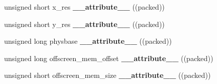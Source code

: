 \begin{DoxyCompactItemize}
\mbox{\label{structvbe__mode__info_a1abb0823b09518fd0309f96668c5eb8f}} 
unsigned short x\+\_\+res {\bfseries \+\_\+\+\_\+attribute\+\_\+\+\_\+} ((packed))
\item 
\mbox{\label{structvbe__mode__info_acfdd8399cde24d55510f128a7b5a5cbe}} 
unsigned short y\+\_\+res {\bfseries \+\_\+\+\_\+attribute\+\_\+\+\_\+} ((packed))
\item 
\mbox{\label{structvbe__mode__info_a3ca825209cb30a9f70014ea23e3b7727}} 
unsigned long physbase {\bfseries \+\_\+\+\_\+attribute\+\_\+\+\_\+} ((packed))
\item 
\mbox{\label{structvbe__mode__info_a6349078974d6e2297677cc94038f128c}} 
unsigned long offscreen\+\_\+mem\+\_\+offset {\bfseries \+\_\+\+\_\+attribute\+\_\+\+\_\+} ((packed))
\item 
\mbox{\label{structvbe__mode__info_a4716dfab3c43156e4a422b9039a0ad0a}} 
unsigned short offscreen\+\_\+mem\+\_\+size {\bfseries \+\_\+\+\_\+attribute\+\_\+\+\_\+} ((packed))
\end{DoxyCompactItemize}
